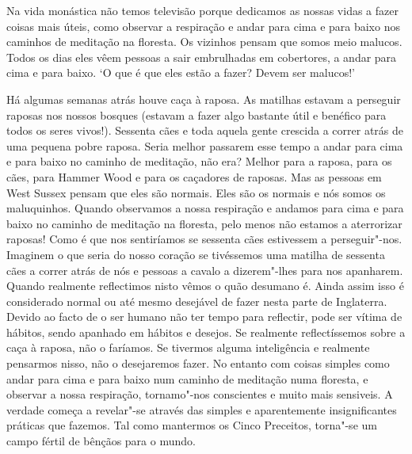 Na vida monástica não temos televisão porque dedicamos as nossas vidas a
fazer coisas mais úteis, como observar a respiração e andar para cima e
para baixo nos caminhos de meditação na floresta. Os vizinhos pensam que
somos meio malucos. Todos os dias eles vêem pessoas a sair embrulhadas
em cobertores, a andar para cima e para baixo. `O que é que eles estão a
fazer? Devem ser malucos!'

Há algumas semanas atrás houve caça à raposa. As matilhas estavam a
perseguir raposas nos nossos bosques (estavam a fazer algo bastante útil
e benéfico para todos os seres vivos!). Sessenta cães e toda aquela
gente crescida a correr atrás de uma pequena pobre raposa. Seria melhor
passarem esse tempo a andar para cima e para baixo no caminho de
meditação, não era? Melhor para a raposa, para os cães, para Hammer Wood
e para os caçadores de raposas. Mas as pessoas em West Sussex pensam que
eles são normais. Eles são os normais e nós somos os maluquinhos. Quando
observamos a nossa respiração e andamos para cima e para baixo no
caminho de meditação na floresta, pelo menos não
estamos a aterrorizar raposas! Como é que nos sentiríamos se
sessenta cães estivessem a perseguir"-nos. Imaginem o que seria do nosso
coração se tivéssemos uma matilha de sessenta cães a correr atrás de nós
e pessoas a cavalo a dizerem"-lhes para nos apanharem. Quando realmente
reflectimos nisto vêmos o quão desumano é. Ainda assim isso é
considerado normal ou até mesmo desejável de fazer nesta parte de
Inglaterra. Devido ao facto de o ser humano não ter tempo para
reflectir, pode ser vítima de hábitos, sendo apanhado em hábitos e
desejos. Se realmente reflectíssemos sobre a caça à raposa, não o
faríamos. Se tivermos alguma inteligência e realmente pensarmos nisso,
não o desejaremos fazer. No entanto com coisas simples como andar para
cima e para baixo num caminho de meditação numa floresta, e observar a
nossa respiração, tornamo"-nos conscientes e muito mais sensiveis. A
verdade começa a revelar"-se através das simples e aparentemente
insignificantes práticas que fazemos. Tal como mantermos os Cinco
Preceitos, torna"-se um campo fértil de bênçãos para o mundo.

